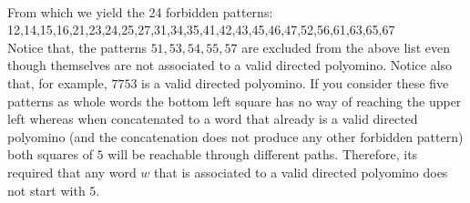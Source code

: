\documentclass[12pt]{report}
\begin{document}
{{\begin{figure}[ht]
\begin{subfigure}[b]{0.1\textwidth}
\end{subfigure}\begin{subfigure}[b]{0.1\textwidth}
        	\centering


\end{subfigure}
         
\end{figure} \quad \\

\noindent From which we yield the 24 forbidden patterns: \\

12,14,15,16,21,23,24,25,27,31,34,35,41,42,43,45,46,47,52,56,61,63,65,67 \\

\noindent Notice that, the patterns $51,53,54,55,57$ are excluded from the above list even though themselves are not associated to a valid directed polyomino. Notice also that, for example, $7753$ is a valid directed polyomino. If you consider these five patterns as whole words the bottom left square has no way of reaching the upper left whereas when concatenated to a word that already is a valid directed polyomino (and the concatenation does not produce any other forbidden pattern) both squares of $5$ will be reachable through different paths. Therefore, its required that any word $w$ that is associated to a valid directed polyomino does not start with $5$. \\

}}
\end{document}

